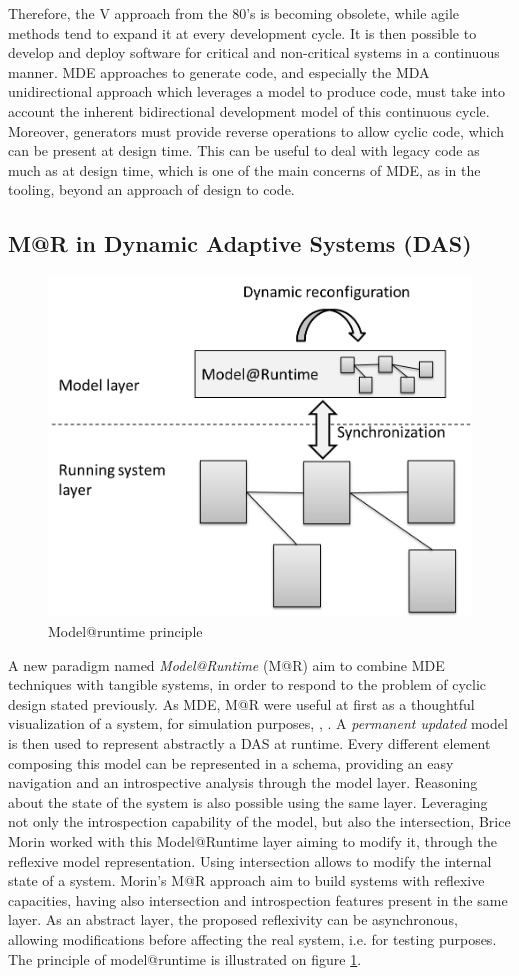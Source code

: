 Therefore, the V approach from the 80's is becoming obsolete, while agile methods tend to expand it at every development cycle.
It is then possible to develop and deploy software for critical and non-critical systems in a continuous manner.
MDE approaches to generate code, and especially the MDA unidirectional approach which leverages a model to produce code, must take into account the inherent bidirectional development model of this continuous cycle.
Moreover, generators must provide reverse operations to allow cyclic code, which can be present at design time.
This can be useful to deal with legacy code as much as at design time, which is one of the main concerns of MDE, as in the tooling, beyond an approach of design to code.

\subsection{M@R in Dynamic Adaptive Systems (DAS)}
\begin{figure}[]
	\centering
	\includegraphics[width=0.65\columnwidth]{chapters/stateOfTheArt.images/MAR_Overview.png}
	\caption{Model@runtime principle} 
	\label{fig:MAROverview}
\end{figure}
A new paradigm named \textit{Model@Runtime} (M@R) aim to combine MDE techniques with tangible systems, in order to respond to the problem of cyclic design stated previously.
As MDE, M@R were useful at first as a thoughtful visualization of a system, for simulation purposes\cite{oreizy1999architecture}, \cite{blair2009models}, \cite{zhang2006model}.
A \textit{permanent updated} model is then used to represent abstractly a DAS at runtime.
Every different element composing this model can be represented in a schema, providing an easy navigation and an introspective analysis through the model layer.
Reasoning about the state of the system is also possible using the same layer.
Leveraging not only the introspection capability of the model, but also the intersection, Brice Morin\cite{morin2010leveraging} worked with this Model@Runtime layer aiming to modify it, through the reflexive model representation.
Using intersection allows to modify the internal state of a system\cite{paepcke1993object}.
Morin's M@R approach aim to build systems with reflexive capacities, having also intersection and introspection features present in the same layer.
As an abstract layer, the proposed reflexivity can be asynchronous, allowing modifications before affecting the real system, i.e. for testing purposes. 
The principle of model@runtime is illustrated on figure \ref{fig:MAROverview}.

